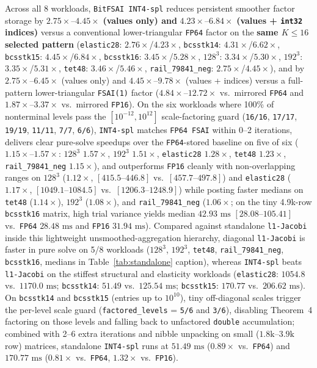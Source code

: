 \documentclass[10pt]{article}
\begin{document}
Across all 8 workloads, \texttt{BitFSAI INT4-spl} reduces persistent smoother factor storage by $\mathbf{2.75\times\text{--}4.45\times}$ \textbf{(values only) and} $\mathbf{4.23\times\text{--}6.84\times}$ \textbf{(values + \texttt{int32} indices)} versus a conventional lower-triangular \texttt{FP64} factor on the \textbf{same $K \le 16$ selected pattern} (\texttt{elastic28}: $2.76\times$/$4.23\times$, \texttt{bcsstk14}: $4.31\times$/$6.62\times$, \texttt{bcsstk15}: $4.45\times$/$6.84\times$, \texttt{bcsstk16}: $3.45\times$/$5.28\times$, $128^3$: $3.34\times$/$5.30\times$, $192^3$: $3.35\times$/$5.31\times$, \texttt{tet48}: $3.46\times$/$5.46\times$, \texttt{rail\_79841\_neg}: $2.75\times$/$4.45\times$), and by $\mathbf{2.75\times\text{--}6.45\times}$ (values only) and $\mathbf{4.45\times\text{--}9.78\times}$ (values + indices) versus a full-pattern lower-triangular \texttt{FSAI(1)} factor ($4.84\times$--$12.72\times$ vs.\ mirrored \texttt{FP64} and $1.87\times$--$3.37\times$ vs.\ mirrored \texttt{FP16}). On the six workloads where 100\% of nonterminal levels pass the $[10^{-12}, 10^{12}]$ scale-factoring guard (\texttt{16/16}, \texttt{17/17}, \texttt{19/19}, \texttt{11/11}, \texttt{7/7}, \texttt{6/6}), \texttt{INT4-spl} matches \texttt{FP64 FSAI} within 0--2 iterations, delivers clear pure-solve speedups over the \texttt{FP64}-stored baseline on five of six ($1.15\times$--$1.57\times$: $128^3$ $1.57\times$, $192^3$ $1.51\times$, \texttt{elastic28} $1.28\times$, \texttt{tet48} $1.23\times$, \texttt{rail\_79841\_neg} $1.15\times$), and outperforms \texttt{FP16} cleanly with non-overlapping ranges on $128^3$ ($1.12\times$, $[415.5\text{--}446.8]$ vs.\ $[457.7\text{--}497.8]$) and \texttt{elastic28} ($1.17\times$, $[1049.1\text{--}1084.5]$ vs.\ $[1206.3\text{--}1248.9]$) while posting faster medians on \texttt{tet48} ($1.14\times$), $192^3$ ($1.08\times$), and \texttt{rail\_79841\_neg} ($1.06\times$; on the tiny 4.9k-row \texttt{bcsstk16} matrix, high trial variance yields median $42.93\text{ ms}$ $[28.08\text{--}105.41]$ vs.\ \texttt{FP64} $28.48\text{ ms}$ and \texttt{FP16} $31.94\text{ ms}$). Compared against standalone \texttt{l1-Jacobi} inside this lightweight unsmoothed-aggregation hierarchy, diagonal \texttt{l1-Jacobi} is faster in pure solve on 5/8 workloads ($128^3$, $192^3$, \texttt{tet48}, \texttt{rail\_79841\_neg}, \texttt{bcsstk16}, medians in Table~\ref{tab:standalone} caption), whereas \texttt{INT4-spl} beats \texttt{l1-Jacobi} on the stiffest structural and elasticity workloads (\texttt{elastic28}: $1054.8$ vs.\ $1170.0\text{ ms}$; \texttt{bcsstk14}: $51.49$ vs.\ $125.54\text{ ms}$; \texttt{bcsstk15}: $170.77$ vs.\ $206.62\text{ ms}$). On \texttt{bcsstk14} and \texttt{bcsstk15} (entries up to $10^{10}$), tiny off-diagonal scales trigger the per-level scale guard (\texttt{factored\_levels} = \texttt{5/6} and \texttt{3/6}), disabling Theorem~4 factoring on those levels and falling back to unfactored \texttt{double} accumulation; combined with 2--6 extra iterations and nibble unpacking on small ($1.8\text{k}$--$3.9\text{k}$ row) matrices, standalone \texttt{INT4-spl} runs at $51.49\text{ ms}$ ($0.89\times$ vs.\ \texttt{FP64}) and $170.77\text{ ms}$ ($0.81\times$ vs.\ \texttt{FP64}, $1.32\times$ vs.\ \texttt{FP16}).
\end{document}
